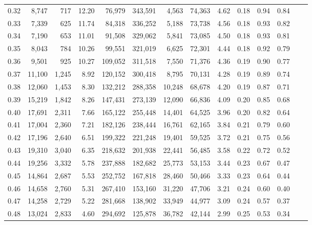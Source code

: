 \begin{tabular}{rrrrrrrrrrrrrr}
0.32 &   8,747 &    717 &   12.20 &   76,979 &  343,591 &   4,563 &  74,363 &  4.62 &  0.18 &  0.94 &      0.84 \\
0.33 &   7,339 &    625 &   11.74 &   84,318 &  336,252 &   5,188 &  73,738 &  4.56 &  0.18 &  0.93 &      0.82 \\
0.34 &   7,190 &    653 &   11.01 &   91,508 &  329,062 &   5,841 &  73,085 &  4.50 &  0.18 &  0.93 &      0.81 \\
0.35 &   8,043 &    784 &   10.26 &   99,551 &  321,019 &   6,625 &  72,301 &  4.44 &  0.18 &  0.92 &      0.79 \\
0.36 &   9,501 &    925 &   10.27 &  109,052 &  311,518 &   7,550 &  71,376 &  4.36 &  0.19 &  0.90 &      0.77 \\
0.37 &  11,100 &  1,245 &    8.92 &  120,152 &  300,418 &   8,795 &  70,131 &  4.28 &  0.19 &  0.89 &      0.74 \\
0.38 &  12,060 &  1,453 &    8.30 &  132,212 &  288,358 &  10,248 &  68,678 &  4.20 &  0.19 &  0.87 &      0.71 \\
0.39 &  15,219 &  1,842 &    8.26 &  147,431 &  273,139 &  12,090 &  66,836 &  4.09 &  0.20 &  0.85 &      0.68 \\
0.40 &  17,691 &  2,311 &    7.66 &  165,122 &  255,448 &  14,401 &  64,525 &  3.96 &  0.20 &  0.82 &      0.64 \\
0.41 &  17,004 &  2,360 &    7.21 &  182,126 &  238,444 &  16,761 &  62,165 &  3.84 &  0.21 &  0.79 &      0.60 \\
0.42 &  17,196 &  2,640 &    6.51 &  199,322 &  221,248 &  19,401 &  59,525 &  3.72 &  0.21 &  0.75 &      0.56 \\
0.43 &  19,310 &  3,040 &    6.35 &  218,632 &  201,938 &  22,441 &  56,485 &  3.58 &  0.22 &  0.72 &      0.52 \\
0.44 &  19,256 &  3,332 &    5.78 &  237,888 &  182,682 &  25,773 &  53,153 &  3.44 &  0.23 &  0.67 &      0.47 \\
0.45 &  14,864 &  2,687 &    5.53 &  252,752 &  167,818 &  28,460 &  50,466 &  3.33 &  0.23 &  0.64 &      0.44 \\
0.46 &  14,658 &  2,760 &    5.31 &  267,410 &  153,160 &  31,220 &  47,706 &  3.21 &  0.24 &  0.60 &      0.40 \\
0.47 &  14,258 &  2,729 &    5.22 &  281,668 &  138,902 &  33,949 &  44,977 &  3.09 &  0.24 &  0.57 &      0.37 \\
0.48 &  13,024 &  2,833 &    4.60 &  294,692 &  125,878 &  36,782 &  42,144 &  2.99 &  0.25 &  0.53 &      0.34 \\

\end{tabular}
